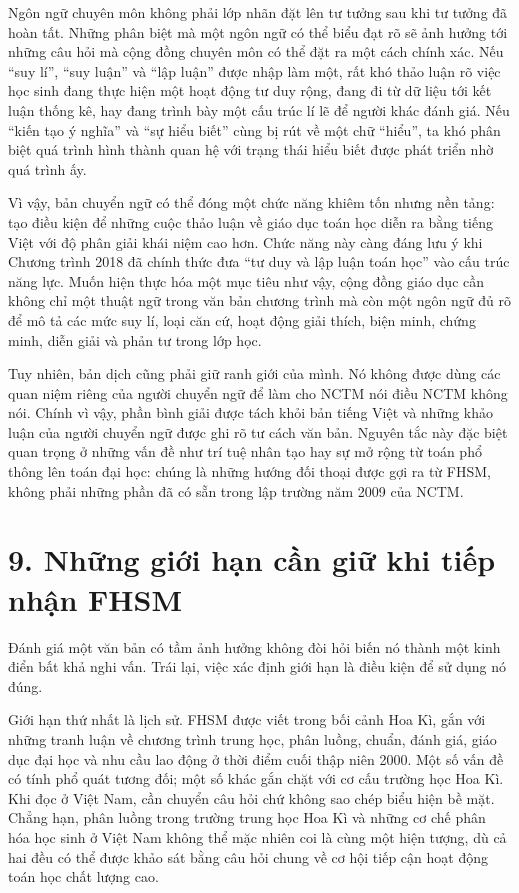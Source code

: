 Ngôn ngữ chuyên môn không phải lớp nhãn đặt lên tư tưởng sau khi tư tưởng đã
hoàn tất. Những phân biệt mà một ngôn ngữ có thể biểu đạt rõ sẽ ảnh hưởng tới
những câu hỏi mà cộng đồng chuyên môn có thể đặt ra một cách chính xác. Nếu
``suy lí'', ``suy luận'' và ``lập luận'' được nhập làm một, rất khó thảo luận
rõ việc học sinh đang thực hiện một hoạt động tư duy rộng, đang đi từ dữ liệu
tới kết luận thống kê, hay đang trình bày một cấu trúc lí lẽ để người khác
đánh giá. Nếu ``kiến tạo ý nghĩa'' và ``sự hiểu biết'' cùng bị rút về một chữ
``hiểu'', ta khó phân biệt quá trình hình thành quan hệ với trạng thái hiểu
biết được phát triển nhờ quá trình ấy.

Vì vậy, bản chuyển ngữ có thể đóng một chức năng khiêm tốn nhưng nền tảng:
tạo điều kiện để những cuộc thảo luận về giáo dục toán học diễn ra bằng tiếng
Việt với độ phân giải khái niệm cao hơn. Chức năng này càng đáng lưu ý khi
Chương trình 2018 đã chính thức đưa ``tư duy và lập luận toán học'' vào cấu
trúc năng lực. Muốn hiện thực hóa một mục tiêu như vậy, cộng đồng giáo dục cần
không chỉ một thuật ngữ trong văn bản chương trình mà còn một ngôn ngữ đủ rõ
để mô tả các mức suy lí, loại căn cứ, hoạt động giải thích, biện minh, chứng
minh, diễn giải và phản tư trong lớp học.

Tuy nhiên, bản dịch cũng phải giữ ranh giới của mình. Nó không được dùng các
quan niệm riêng của người chuyển ngữ để làm cho NCTM nói điều NCTM không nói.
Chính vì vậy, phần bình giải được tách khỏi bản tiếng Việt và những khảo luận
của người chuyển ngữ được ghi rõ tư cách văn bản. Nguyên tắc này đặc biệt
quan trọng ở những vấn đề như trí tuệ nhân tạo hay sự mở rộng từ toán phổ
thông lên toán đại học: chúng là những hướng đối thoại được gợi ra từ FHSM,
không phải những phần đã có sẵn trong lập trường năm 2009 của NCTM.

\section*{9. Những giới hạn cần giữ khi tiếp nhận FHSM}

Đánh giá một văn bản có tầm ảnh hưởng không đòi hỏi biến nó thành một kinh
điển bất khả nghi vấn. Trái lại, việc xác định giới hạn là điều kiện để sử
dụng nó đúng.

Giới hạn thứ nhất là lịch sử. FHSM được viết trong bối cảnh Hoa Kì, gắn với
những tranh luận về chương trình trung học, phân luồng, chuẩn, đánh giá, giáo
dục đại học và nhu cầu lao động ở thời điểm cuối thập niên 2000. Một số vấn
đề có tính phổ quát tương đối; một số khác gắn chặt với cơ cấu trường học Hoa
Kì. Khi đọc ở Việt Nam, cần chuyển câu hỏi chứ không sao chép biểu hiện bề
mặt. Chẳng hạn, phân luồng trong trường trung học Hoa Kì và những cơ chế phân
hóa học sinh ở Việt Nam không thể mặc nhiên coi là cùng một hiện tượng, dù cả
hai đều có thể được khảo sát bằng câu hỏi chung về cơ hội tiếp cận hoạt động
toán học chất lượng cao.

